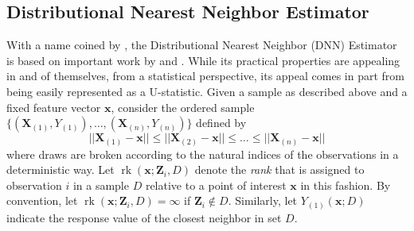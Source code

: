 \documentclass[letterpaper,10pt]{article}
\numberwithin{equation}{section}
\numberwithin{thm}{section}
\newcommand{\1}{\mathbb{1}}
\begin{document}
\subsection{Distributional Nearest Neighbor Estimator}
With a name coined by \citet{demirkaya_optimal_2024}, the Distributional Nearest Neighbor (DNN) Estimator is based on important work by \citet{steele_exact_2009} and \citet{biau_rate_2010}.
While its practical properties are appealing in and of themselves, from a statistical perspective, its appeal comes in part from being easily represented as a U-statistic.
Given a sample as described above and a fixed feature vector $\mathbf{x}$, consider the ordered sample $\{(\mathbf{X}_{(1)}, Y_{(1)}), \dotsc, (\mathbf{X}_{(n)}, Y_{(n)})\}$ defined by
\begin{equation}\label{ordering}
	||\mathbf{X}_{(1)} - \mathbf{x}|| \leq ||\mathbf{X}_{(2)} - \mathbf{x}|| \leq \dotsc \leq ||\mathbf{X}_{(n)} - \mathbf{x}||
\end{equation}
where draws are broken according to the natural indices of the observations in a deterministic way.
Let $\operatorname{rk}(\mathbf{x}; \mathbf{Z}_i, D)$ denote the \textit{rank} that is assigned to observation $i$ in a sample $D$ relative to a point of interest $\mathbf{x}$ in this fashion.
By convention, let $\operatorname{rk}(\mathbf{x}; \mathbf{Z}_i, D) = \infty$ if $\mathbf{Z}_i \not\in D$.
Similarly, let $Y_{(1)}(\mathbf{x}; D)$ indicate the response value of the closest neighbor in set $D$.
\end{document}
